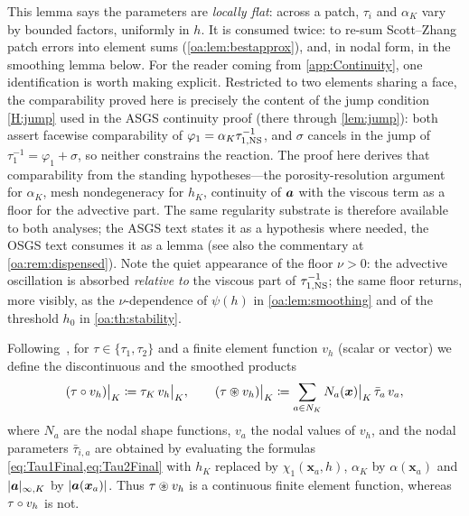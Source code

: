 \begin{pedagogy}
This lemma says the parameters are \emph{locally flat}: across a patch,
$\tau_i$ and $\alpha_K$ vary by bounded factors, uniformly in $h$. It is
consumed twice: to re-sum Scott--Zhang patch errors into element sums
(\cref{oa:lem:bestapprox}), and, in nodal form, in the smoothing lemma below.
For the reader coming from \cref{app:Continuity}, one identification is worth
making explicit. Restricted to two elements sharing a face, the comparability
proved here is precisely the content of the jump condition \cref{H:jump} used
in the ASGS continuity proof (there through \cref{lem:jump}): both assert
facewise comparability of $\varphi_1 = \alpha_K\tau_{1,\mathrm{NS}}^{-1}$, and $\sigma$ cancels
in the jump of $\tau_1^{-1} = \varphi_1 + \sigma$, so neither constrains the
reaction. The proof here derives that comparability from the standing
hypotheses---the porosity-resolution argument for $\alpha_K$, mesh
nondegeneracy for $h_K$, continuity of $\boldsymbol{a}$ with the viscous term as a floor
for the advective part. The same regularity substrate is therefore available to
both analyses; the ASGS text states it as a hypothesis where needed, the OSGS
text consumes it as a lemma (see also the commentary at
\cref{oa:rem:dispensed}). Note the quiet appearance of the floor $\nu > 0$: the
advective oscillation is absorbed \emph{relative to} the viscous part of
$\tau_{1,\mathrm{NS}}^{-1}$; the same floor returns, more visibly, as the $\nu$-dependence of
$\psi(h)$ in \cref{oa:lem:smoothing} and of the threshold $h_0$ in
\cref{oa:th:stability}.
\end{pedagogy}

Following~\cite{codina2008analysis}, for $\tau \in \{\tau_1, \tau_2\}$ and a finite element
function $v_h$ (scalar or vector) we define the discontinuous and the smoothed
products
\begin{equation}
  \label{oa:eq:SmulDef}
  (\tau \circ v_h)\big|_K \coloneqq \tau_{K}\, v_h\big|_K,
  \qquad
  (\tau \circledast v_h)\big|_K \coloneqq \sum_{a \in N_K} N_a(\boldsymbol{x})\big|_K\,
  \bar\tau_{a}\, v_a,
\end{equation}
where $N_a$ are the nodal shape functions, $v_a$ the nodal values of $v_h$, and the
nodal parameters $\bar\tau_{i,a}$ are obtained by evaluating the formulas
\cref{eq:Tau1Final,eq:Tau2Final} with $h_K$ replaced by $\chi_1(\boldsymbol{x}_a, h)$,
$\alpha_K$ by $\alpha(\boldsymbol{x}_a)$ and $|\boldsymbol{a}|_{\infty,K}$ by
$|\boldsymbol{a}(\boldsymbol{x}_a)|$. Thus $\tau \circledast v_h$ is a continuous finite element
function, whereas $\tau \circ v_h$ is not.

